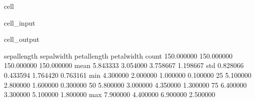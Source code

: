 \documentclass[letterpaper,10pt,english]{jupyterBook}
\begin{document}
\begin{sphinxuseclass}{cell}\begin{sphinxVerbatimInput}

\begin{sphinxuseclass}{cell_input}
\begin{sphinxVerbatim}[commandchars=\\\{\}]
\end{sphinxVerbatim}

\end{sphinxuseclass}\end{sphinxVerbatimInput}
\begin{sphinxVerbatimOutput}

\begin{sphinxuseclass}{cell_output}
\begin{sphinxVerbatim}[commandchars=\\\{\}]
       sepal\PYGZhy{}length  sepal\PYGZhy{}width  petal\PYGZhy{}length  petal\PYGZhy{}width
count    150.000000   150.000000    150.000000   150.000000
mean       5.843333     3.054000      3.758667     1.198667
std        0.828066     0.433594      1.764420     0.763161
min        4.300000     2.000000      1.000000     0.100000
25\PYGZpc{}        5.100000     2.800000      1.600000     0.300000
50\PYGZpc{}        5.800000     3.000000      4.350000     1.300000
75\PYGZpc{}        6.400000     3.300000      5.100000     1.800000
max        7.900000     4.400000      6.900000     2.500000
\end{sphinxVerbatim}

\end{sphinxuseclass}\end{sphinxVerbatimOutput}

\end{sphinxuseclass}
\end{document}
